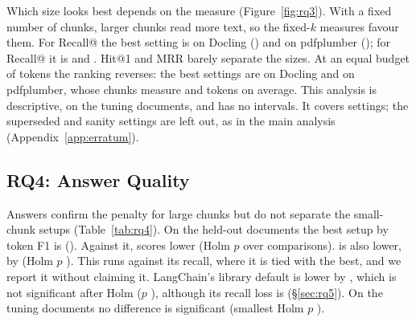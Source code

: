 Which size looks best depends on the measure (Figure~\ref{fig:rq3}).
With a fixed number of chunks, larger chunks read more text, so the
fixed-$k$ measures favour them. For Recall@\TopKSmall{} the best setting
is \RQthreeDoclingRecallFiveBest{} on Docling
(\RQthreeDoclingRecallFiveScore{}) and \RQthreePdfplumberRecallFiveBest{}
on pdfplumber (\RQthreePdfplumberRecallFiveScore{}); for
Recall@\TopKLarge{} it is \RQthreeDoclingRecallOneZeroBest{} and
\RQthreePdfplumberRecallOneZeroBest{}. Hit@1 and MRR barely separate the
sizes. At an equal budget of \FixedKBudget{} tokens the ranking reverses:
the best settings are \RQthreeDoclingRecallFourZeroZeroZeroBest{} on
Docling and \RQthreePdfplumberRecallFourZeroZeroZeroBest{} on
pdfplumber, whose chunks measure \RQthreeDoclingRecallFourZeroZeroZeroSize{}
and \RQthreePdfplumberRecallFourZeroZeroZeroSize{} tokens on average.
This analysis is descriptive, on the tuning documents, and has no
intervals. It covers \RQthreeSettingsKept{} settings; the
\RQthreeSettingsLeftOut{} superseded and sanity settings are left out,
as in the main analysis (Appendix~\ref{app:erratum}).

\subsection{RQ4: Answer Quality}
\label{sec:rq4}

\begin{table}[t]
\centering
{}
\caption{RQ4: answer token F1 on the held-out documents, each setup against the best setup, \RQfourBest{} (F1 \RQfourBestFOne{}); intervals and Holm $p$ over \RQfourComparisons{} comparisons.}
\label{tab:rq4}
\end{table}

Answers confirm the penalty for large chunks but do not separate the
small-chunk setups (Table~\ref{tab:rq4}). On the held-out documents the
best setup by token F1 is \RQfourBest{} (\RQfourBestFOne{}). Against it,
\RQfourDoclingFixedTokenSizeOneZeroTwoFourSetup{} scores
\RQfourDoclingFixedTokenSizeOneZeroTwoFourDiff{} lower
\RQfourDoclingFixedTokenSizeOneZeroTwoFourCI{} (Holm $p$
\RQfourDoclingFixedTokenSizeOneZeroTwoFourHolm{} over
\RQfourComparisons{} comparisons).
\RQfourDoclingMethodOneTreeTThreeEightFourSetup{} is also lower, by
\RQfourDoclingMethodOneTreeTThreeEightFourDiff{}
\RQfourDoclingMethodOneTreeTThreeEightFourCI{} (Holm $p$
\RQfourDoclingMethodOneTreeTThreeEightFourHolm{}). This runs against its
recall, where it is tied with the best, and we report it without
claiming it. LangChain's library default is lower by
\RQfourDoclingLangchainDefaultDiff{} \RQfourDoclingLangchainDefaultCI{},
which is not significant after Holm ($p$
\RQfourDoclingLangchainDefaultHolm{}), although its recall loss is
(\S\ref{sec:rq5}). On the tuning documents no difference is significant
(smallest Holm $p$ \RQfourTuningMinHolm{}).

